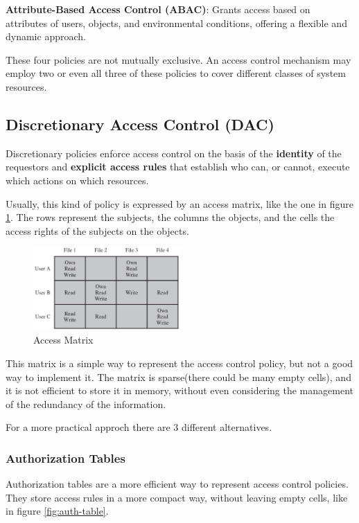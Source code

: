 \textbf{Attribute-Based Access Control (ABAC)}: Grants access based on
attributes of users, objects, and environmental conditions, offering a flexible
and dynamic approach.

These four policies are not mutually exclusive. An access control
mechanism may employ two or even all three of these policies to cover
different classes of system resources.

\subsection{Discretionary Access Control (DAC)}
\begin{boxH}
  Discretionary policies enforce access control on the basis of the
  \textbf{identity} of the requestors and \textbf{explicit access
  rules} that establish who can, or cannot, execute which actions on
  which resources.
\end{boxH}
Usually, this kind of policy is expressed by an access matrix, like
the one in figure \ref{fig:access-matrix}. The rows represent the 
subjects, the columns the objects, and the cells the access rights of 
the subjects on the objects.

\begin{figure}[H]
  \centering
  \includegraphics[width=0.5\textwidth]{img/access matrix.png}
  \caption{Access Matrix}
  \label{fig:access-matrix}
\end{figure}
This matrix is a simple way to represent the access control policy, 
but not a good way to implement it. The matrix is sparse(there could
be many empty cells), and it is not efficient to store it in memory,
without even considering the management of the redundancy of the 
information.

For a more practical approch there are 3 different alternatives.
\subsubsection{Authorization Tables}
Authorization tables are a more efficient way to represent access
control policies. They store access rules in a more compact way,
without leaving empty cells, like in figure \ref{fig:auth-table}.

